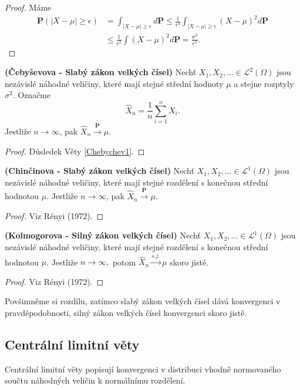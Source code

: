 \begin{proof}
Máme
\begin{align*}
\textbf{P}(|X - \mu | \geq \epsilon) &= \int_{|X - \mu | \geq \epsilon} d\textbf{P} \leq \frac{1}{\epsilon^{2}}\int_{|X - \mu | \geq \epsilon} (X - \mu)^{2}d\textbf{P} \\
&\leq \frac{1}{\epsilon^{2}} \int (X - \mu)^{2}d\textbf{P} = \frac{\sigma^{2}}{\epsilon^{2}}.
\end{align*}
\end{proof}

\begin{theorem}{\textbf{(Čebyševova - Slabý zákon velkých čísel)}}
Nechť $X_{1}, X_{2}, ... \in \mathcal{L}^{2}(\Omega)$ jsou nezávislé náhodné veličiny, které mají stejné střední hodnoty $\mu$ a stejne rozptyly $\sigma^{2}$. Označme
\begin{equation}
\hat{X}_{n} = \frac{1}{n}\sum_{i = 1}^{n} X_{i}.
\end{equation}
Jestliže $n \longrightarrow \infty$, pak $\hat{X}_{n} \xrightarrow{\mathbf{P}} \mu$.
\end{theorem}
\begin{proof}
Důsledek Věty \ref{Chebychev1}.
\end{proof}

\begin{theorem}{\textbf{(Chinčinova - Slabý zákon velkých čísel)}}
Nechť $X_{1}, X_{2}, ... \in \mathcal{L}^{1}(\Omega)$ jsou nezávislé náhodné veličiny, které mají stejné rozdělení s konečnou střední hodnotou $\mu$. Jestliže $n \longrightarrow \infty$, pak $\hat{X}_{n} \xrightarrow{\mathbf{P}} \mu$.
\end{theorem}
\begin{proof}
Viz Rényi (1972).
\end{proof}

\begin{theorem}{\textbf{(Kolmogorova - Silný zákon velkých čísel)}}
Nechť $X_{1}, X_{2}, ... \in \mathcal{L}^{1}(\Omega)$ jsou nezávislé náhodné veličiny, které mají stejné rozdělení s konečnou střední hodnotou $\mu$. Jestliže $n \longrightarrow \infty,$ potom $\hat{X}_{n} \xrightarrow{s.j.} \mu$ skoro jistě.
\end{theorem}
\begin{proof}
Viz Rényi (1972).
\end{proof}
Povšimněme si rozdílu, zatímco slabý zákon velkých čísel dává konvergenci v pravděpodobnosti, silný zákon velkých čísel konvergenci skoro jistě.

\subsection{Centrální limitní věty}
Centrální limitní věty popisují konvergenci v distribuci vhodně normovaného součtu náhodných veličin k normálnímu rozdělení.

